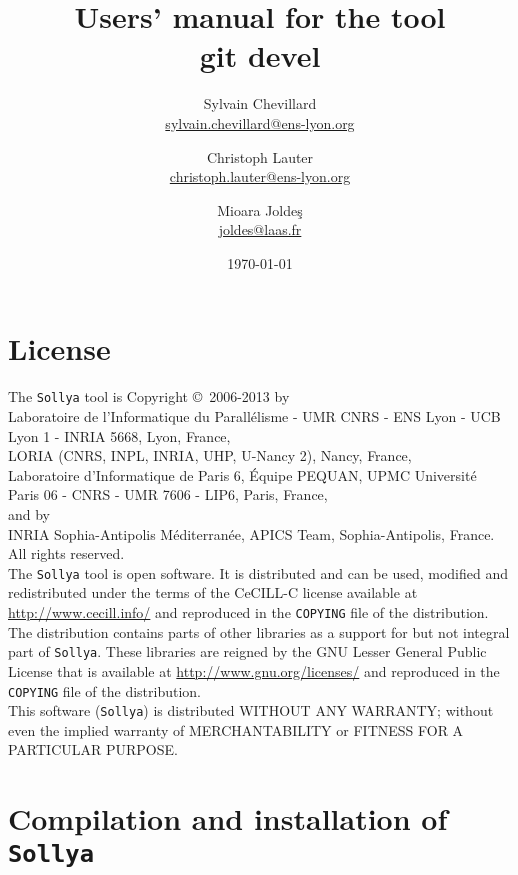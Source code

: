 \documentclass[a4paper]{article}
\title{Users' manual for the \sollya tool \\ {\large git devel}}
\author{Sylvain Chevillard \\ \small{\url{sylvain.chevillard@ens-lyon.org}} \and Christoph Lauter \\ \small{\url{christoph.lauter@ens-lyon.org}} \and Mioara Jolde\c{s} \\ \small{\url{joldes@laas.fr}} }
\date{\today}
\newcommand{\sollya}{\texttt{Sollya}\xspace}
\begin{document}
\maketitle

\section*{License}

The \sollya tool is Copyright \copyright~2006-2013 by \vspace{2mm} \\
\indent Laboratoire de
l'Informatique du Parall\'elisme - UMR CNRS - ENS Lyon - UCB Lyon 1 -
INRIA 5668, Lyon, France, \vspace{2mm} \\
\indent LORIA (CNRS, INPL, INRIA, UHP, U-Nancy 2), Nancy, France, \vspace{2mm} \\
\indent Laboratoire d'Informatique de Paris 6, \'Equipe PEQUAN,
UPMC Universit\'e Paris 06 - CNRS - UMR 7606 - LIP6, Paris, France,\vspace{2mm} \\  and by \vspace{2mm} \\
\indent INRIA Sophia-Antipolis M\'editerran\'ee, APICS Team, Sophia-Antipolis, France. \\
All rights reserved.\\[0.2cm]

\noindent The \sollya tool is open software. It is distributed and can be used,
modified and redistributed under the terms of the CeCILL-C license
available at \url{http://www.cecill.info/} and reproduced in the
\texttt{COPYING} file of the distribution. The distribution contains
parts of other libraries as a support for but not integral part of
\sollya. These libraries are reigned by the GNU Lesser General Public
License that is available at \url{http://www.gnu.org/licenses/} and
reproduced in the \texttt{COPYING} file of the distribution.\\[0.2cm]

\noindent This software (\sollya) is distributed WITHOUT ANY WARRANTY; without even the 
implied warranty of MERCHANTABILITY or FITNESS FOR A PARTICULAR PURPOSE.

\tableofcontents

\section{Compilation and installation of \sollya}
\end{document}

